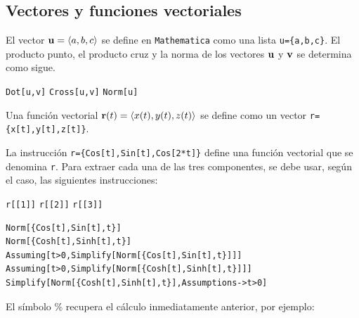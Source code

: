     \subsection{Vectores y funciones vectoriales}
    El vector ${\bf u}= \langle a,b,c \rangle$ se define en \verb"Mathematica" como una lista \verb"u={a,b,c}".
    El producto punto, el producto cruz y la norma de los vectores ${\bf u}$ y ${\bf v}$ se determina como sigue.
    \begin{tcolorbox}[title=Vectores]
      \verb"Dot[u,v]" \hskip1.75cm \verb"Cross[u,v]" \hskip1.75cm \verb"Norm[u]"
    \end{tcolorbox}

    \begin{tcolorbox}[title=Funciones vectoriales]
      Una función vectorial ${\bf r}(t)= \left \langle x(t), y(t), z(t)\right \rangle$ se define como un vector
      \verb"r={x[t],y[t],z[t]}".
    \end{tcolorbox}
    La instrucción  \verb"r={Cos[t],Sin[t],Cos[2*t]}" define una función vectorial que se denomina \verb"r".
    Para extraer cada una de las tres componentes,
    se debe usar, según el caso, las siguientes instrucciones:

    \begin{center}
      \verb"r[[1]]" \hspace{3cm} \verb"r[[2]]" \hspace{3cm} \verb"r[[3]]"
    \end{center}


    \begin{tcolorbox}[title=Usos de \verb"Assuming" y \verb"Assumptions"]
\begin{Verbatim}[formatcom=\letraverbatim]
Norm[{Cos[t],Sin[t],t}]
Norm[{Cosh[t],Sinh[t],t}]
Assuming[t>0,Simplify[Norm[{Cos[t],Sin[t],t}]]]
Assuming[t>0,Simplify[Norm[{Cosh[t],Sinh[t],t}]]]
Simplify[Norm[{Cosh[t],Sinh[t],t}],Assumptions->t>0]
\end{Verbatim}
    \end{tcolorbox}

    El símbolo $\%$ recupera el cálculo inmediatamente anterior, por ejemplo:

